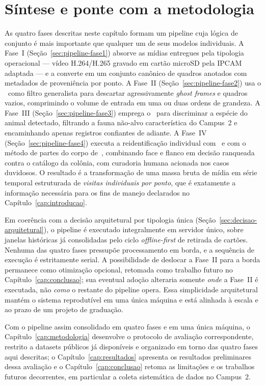 \section{Síntese e ponte com a metodologia}
\label{sec:pipeline-sintese}

As quatro fases descritas neste capítulo formam um pipeline cuja lógica de conjunto é mais importante que qualquer um de seus modelos individuais. A Fase~I (Seção~\ref{sec:pipeline-fase1}) absorve as mídias entregues pela tipologia operacional --- vídeo H.264/H.265 gravado em cartão microSD pela IPCAM adaptada --- e a converte em um conjunto canônico de quadros anotados com metadados de proveniência por ponto. A Fase~II (Seção~\ref{sec:pipeline-fase2}) usa o \modeloMD~como filtro generalista para descartar agressivamente \emph{ghost frames} e quadros vazios, comprimindo o volume de entrada em uma ou duas ordens de grandeza. A Fase~III (Seção~\ref{sec:pipeline-fase3}) emprega o \modeloSN~para discriminar a espécie do animal detectado, filtrando a fauna não-alvo característica do Campus~2 e encaminhando apenas registros confiantes de  adiante. A Fase~IV (Seção~\ref{sec:pipeline-fase4}) executa a reidentificação individual com \modeloPetFace~e com o método de partes do corpo de~, combinando face e flanco em decisão ranqueada contra o catálogo da colônia, com curadoria humana acionada nos casos duvidosos. O resultado é a transformação de uma massa bruta de mídia em série temporal estruturada de \emph{visitas individuais por ponto}, que é exatamente a informação necessária para os fins de manejo declarados no Capítulo~\ref{cap:introducao}.

Em coerência com a decisão arquitetural por tipologia única (Seção~\ref{sec:decisao-arquitetural}), o pipeline é executado integralmente em servidor único, sobre janelas históricas já consolidadas pelo ciclo \emph{offline-first} de retirada de cartões. Nenhuma das quatro fases pressupõe processamento em borda, e a sequência de execução é estritamente serial. A possibilidade de deslocar a Fase~II para a borda permanece como otimização opcional, retomada como trabalho futuro no Capítulo~\ref{cap:conclusao}; sua eventual adoção alteraria somente \emph{onde} a Fase~II é executada, não \emph{como} o restante do pipeline opera. Essa simplicidade arquitetural mantém o sistema reprodutível em uma única máquina e está alinhada à escala e ao prazo de um projeto de graduação.

Com o pipeline assim consolidado em quatro fases e em uma única máquina, o Capítulo~\ref{cap:metodologia} desenvolve o protocolo de avaliação correspondente, restrito a datasets públicos já disponíveis e organizado em torno das quatro fases aqui descritas; o Capítulo~\ref{cap:resultados} apresenta os resultados preliminares dessa avaliação e o Capítulo~\ref{cap:conclusao} retoma as limitações e os trabalhos futuros decorrentes, em particular a coleta sistemática de dados no Campus~2.
